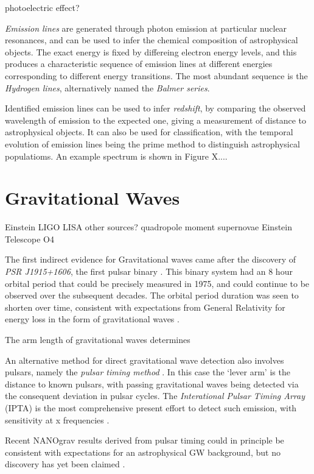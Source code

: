 photoelectric effect?

\emph{Emission lines} are generated through photon emission at particular nuclear resonances, and can be used to infer the chemical composition of astrophysical objects. The exact energy is fixed by differeing electron energy levels, and this produces a characteristic sequence of emission lines at different energies corresponding to different energy transitions. The most abundant sequence is the \emph{Hydrogen lines}, alternatively named the \emph{Balmer series}.

Identified emission lines can be used to infer \emph{redshift}, by comparing the observed wavelength of emission to the expected one, giving a measurement of distance to astrophysical objects. It can also be used for classification, with the temporal evolution of emission lines being the prime method to distinguish astrophysical populatioms. An example spectrum is shown in Figure X....

\section{Gravitational Waves}

Einstein
LIGO
LISA
other sources?
quadropole moment
supernovae
Einstein Telescope
O4

The first indirect evidence for Gravitational waves came after the discovery of \emph{PSR J1915+1606}, the first pulsar binary . This binary system had an 8 hour orbital period that could be precisely measured in 1975, and could continue to be observed over the subsequent decades. The orbital period duration was seen to shorten over time, consistent with expectations from General Relativity for energy loss in the form of gravitational waves . 

The arm length of gravitational waves determines 

An alternative method for direct gravitational wave detection also involves pulsars, namely the \emph{pulsar timing method} . In this case the `lever arm' is the distance to known pulsars, with passing gravitational waves being detected via the consequent deviation in pulsar cycles. The \emph{Interational Pulsar Timing Array} (IPTA) is the most comprehensive present effort to detect such emission, with sensitivity at x frequencies .

Recent NANOgrav results derived from pulsar timing could in principle be consistent with expectations for an astrophysical GW background, but no discovery has yet been claimed .